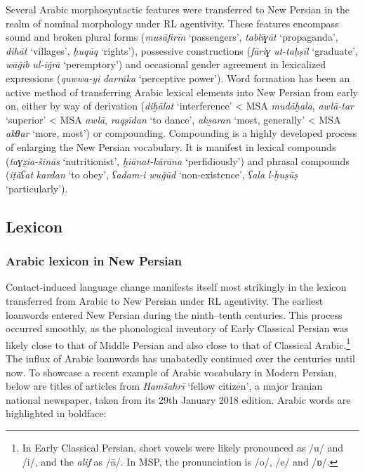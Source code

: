 \documentclass[output=paper]{langsci/langscibook}
\begin{document}
Several Arabic morphosyntactic features were transferred to New Persian in the realm of nominal morphology under RL agentivity. These features encompass sound and broken plural forms (\textit{musāfirīn} ‘passengers’, \textit{tablīɣāt} ‘propaganda’, \textit{dihāt} ‘villages’, \textit{ḥuqūq} ‘rights’), possessive constructions (\textit{fāriɣ} \textit{ut-taḥṣīl} ‘graduate’, \textit{wāǧib} \textit{ul-iǧrā} ‘peremptory’) and occasional gender agreement in lexicalized expressions (\textit{quwwa-yi} \textit{darrāka} ‘perceptive power’). Word formation has been an active method of transferring Arabic lexical elements into New Persian from early on, either by way of derivation (\textit{diḫālat} ‘interference’ < MSA \textit{mudāḫala}, \textit{awlā-tar} ‘superior’ < MSA \textit{awlā}, \textit{raqṣīdan} ‘to dance’, \textit{aks̱aran} ‘most, generally’ < MSA \textit{akθar} ‘more, most’) or compounding. Compounding is a highly developed process of enlarging the New Persian vocabulary. It is manifest in lexical compounds (\textit{taɣẕia-šinās} ‘nutritionist’, \textit{ḫiānat-kārāna} ‘perfidiously’) and phrasal compounds (\textit{iṭāʕat} \textit{kardan} ‘to obey’, \textit{ʕadam-i} \textit{wuǧūd} ‘non-existence’, \textit{ʕala} \textit{l-ḫuṣūṣ} ‘particularly’).

\subsection{Lexicon}

\subsubsection{Arabic lexicon in New Persian}

Contact-induced language change manifests itself most strikingly in the lexicon transferred from Arabic to New Persian under RL agentivity. The earliest loanwords entered New Persian during the ninth–tenth centuries. This process occurred smoothly, as the phonological inventory of Early Classical Persian was likely close to that of Middle Persian and also close to that of Classical Arabic.\footnote{In Early Classical Persian, short vowels were likely pronounced as /u/ and /i/, and the \textit{alif} as /ā/. In MSP, the pronunciation is /o/, /e/ and /ɒ/.} The influx of Arabic loanwords has unabatedly continued over the centuries until now. To showcase a recent example of Arabic vocabulary in Modern Persian, below are titles of articles from \textit{Hamšahrī} ‘fellow citizen’, a major Iranian national newspaper, taken from its 29th January 2018 edition. Arabic words are highlighted in boldface:
\end{document}
